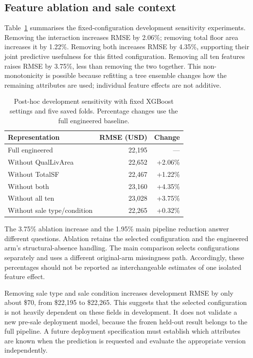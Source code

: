 \documentclass{sigkddExp}
\begin{document}
\subsection{Feature ablation and sale context}
Table~\ref{tab:ablation} summarises the fixed-configuration development sensitivity experiments. Removing the interaction increases RMSE by 2.06\%; removing total floor area increases it by 1.22\%. Removing both increases RMSE by 4.35\%, supporting their joint predictive usefulness for this fitted configuration. Removing all ten features raises RMSE by 3.75\%, less than removing the two together. This non-monotonicity is possible because refitting a tree ensemble changes how the remaining attributes are used; individual feature effects are not additive.

\begin{table}[t]
\caption{Post-hoc development sensitivity with fixed XGBoost settings and five saved folds. Percentage changes use the full engineered baseline.}
\label{tab:ablation}
\centering\small
\begin{tabular}{lrr}
\toprule
Representation & RMSE (USD) & Change\\
\midrule
Full engineered & 22,195 & ---\\
Without QualLivArea & 22,652 & +2.06\%\\
Without TotalSF & 22,467 & +1.22\%\\
Without both & 23,160 & +4.35\%\\
Without all ten & 23,028 & +3.75\%\\
Without sale type/condition & 22,265 & +0.32\%\\
\bottomrule
\end{tabular}
\end{table}

The 3.75\% ablation increase and the 1.95\% main pipeline reduction answer different questions. Ablation retains the selected configuration and the engineered arm's structural-absence handling. The main comparison selects configurations separately and uses a different original-arm missingness path. Accordingly, these percentages should not be reported as interchangeable estimates of one isolated feature effect.

Removing sale type and sale condition increases development RMSE by only about \$70, from \$22,195 to \$22,265. This suggests that the selected configuration is not heavily dependent on these fields in development. It does not validate a new pre-sale deployment model, because the frozen held-out result belongs to the full pipeline. A future deployment specification must establish which attributes are known when the prediction is requested and evaluate the appropriate version independently.
\end{document}
